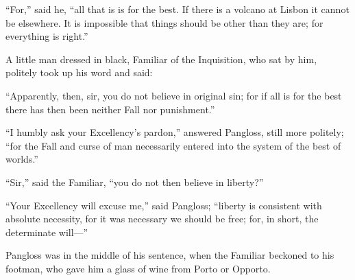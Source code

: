 ``For,'' said he, ``all that is is for the best. If there is a volcano at Lisbon it cannot be elsewhere. It is impossible that things should be other than they are; for everything is right.''

A little man dressed in black, Familiar of the Inquisition, who sat by him, politely took up his word and said:

``Apparently, then, sir, you do not believe in original sin; for if all is for the best there has then been neither Fall nor punishment.''

``I humbly ask your Excellency's pardon,'' answered Pangloss, still more politely; ``for the Fall and curse of man necessarily entered into the system of the best of worlds.''

``Sir,'' said the Familiar, ``you do not then believe in liberty?''

``Your Excellency will excuse me,'' said Pangloss; ``liberty is consistent with absolute necessity, for it was necessary we should be free; for, in short, the determinate will---''

Pangloss was in the middle of his sentence, when the Familiar beckoned to his footman, who gave him a glass of wine from Porto or Opporto.

